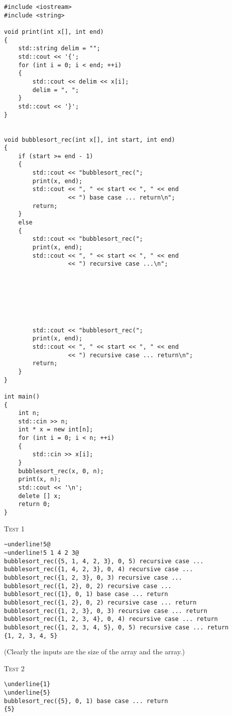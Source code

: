 \begin{Verbatim}[frame=single, fontsize=\small]
#include <iostream>
#include <string>

void print(int x[], int end)
{
    std::string delim = "";
    std::cout << '{';
    for (int i = 0; i < end; ++i)
    {
        std::cout << delim << x[i];
        delim = ", ";
    }
    std::cout << '}';
}


void bubblesort_rec(int x[], int start, int end)
{
    if (start >= end - 1)
    {
        std::cout << "bubblesort_rec(";
        print(x, end);
        std::cout << ", " << start << ", " << end
                  << ") base case ... return\n";
        return;
    }
    else
    {
        std::cout << "bubblesort_rec(";
        print(x, end);
        std::cout << ", " << start << ", " << end
                  << ") recursive case ...\n";




        


        std::cout << "bubblesort_rec(";
        print(x, end);
        std::cout << ", " << start << ", " << end
                  << ") recursive case ... return\n";
        return;
    }
}

int main()
{
    int n;
    std::cin >> n;
    int * x = new int[n];
    for (int i = 0; i < n; ++i)
    {
        std::cin >> x[i];
    }
    bubblesort_rec(x, 0, n);
    print(x, n);
    std::cout << '\n';
    delete [] x;
    return 0;
}
\end{Verbatim}

\textsc{Test 1}
\begin{Verbatim}[commandchars=\~\!\@, fontsize=\small, frame=single]
~underline!5@
~underline!5 1 4 2 3@
bubblesort_rec({5, 1, 4, 2, 3}, 0, 5) recursive case ...
bubblesort_rec({1, 4, 2, 3}, 0, 4) recursive case ...
bubblesort_rec({1, 2, 3}, 0, 3) recursive case ...
bubblesort_rec({1, 2}, 0, 2) recursive case ...
bubblesort_rec({1}, 0, 1) base case ... return
bubblesort_rec({1, 2}, 0, 2) recursive case ... return
bubblesort_rec({1, 2, 3}, 0, 3) recursive case ... return
bubblesort_rec({1, 2, 3, 4}, 0, 4) recursive case ... return
bubblesort_rec({1, 2, 3, 4, 5}, 0, 5) recursive case ... return
{1, 2, 3, 4, 5}
\end{Verbatim}
(Clearly the inputs are the size of the array and the array.)

\textsc{Test 2}
\begin{Verbatim}[commandchars=\\\{\}, fontsize=\small, frame=single]
\underline{1}
\underline{5}
bubblesort_rec({5}, 0, 1) base case ... return
{5}
\end{Verbatim}


